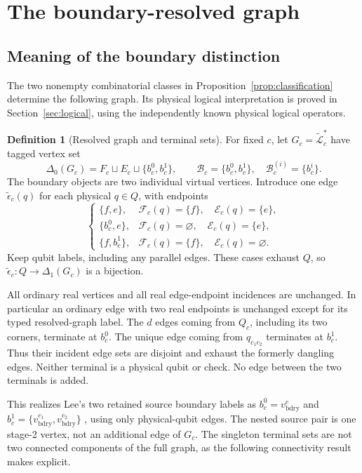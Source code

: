 \documentclass[11pt]{article}
\theoremstyle{definition}
\newtheorem{definition}{Definition}[section]
\theoremstyle{plain}
\theoremstyle{remark}
\newcommand{\LL}{\mathcal L}
\newcommand{\eps}{\epsilon}
\begin{document}
\section{The boundary-resolved graph}\label{sec:resolved}
\subsection{Meaning of the boundary distinction}
The two nonempty combinatorial classes in
Proposition~\ref{prop:classification} determine the following graph.
Its physical logical interpretation is proved in
Section~\ref{sec:logical}, using the independently known physical
logical operators.

\begin{definition}[Resolved graph and terminal sets]\label{def:resolved}
For fixed $c$, let $G_c=\widetilde{\LL}_c^*$ have tagged vertex set
\[
 \Delta_0(G_c)=F_c\sqcup E_c\sqcup\{b_c^0,b_c^1\},\qquad
 \mathcal B_c=\{b_c^0,b_c^1\},\quad
 \mathcal B_c^{(i)}=\{b_c^i\}.
\]
The boundary objects are two individual virtual vertices. Introduce one
edge $\widetilde\eps_c(q)$ for each physical $q\in Q$, with endpoints
\begin{equation}
 \begin{cases}
 \{f,e\},&
  \mathcal F_c(q)=\{f\},\quad\mathcal E_c(q)=\{e\},\\
 \{b_c^0,e\},&
  \mathcal F_c(q)=\varnothing,\quad\mathcal E_c(q)=\{e\},\\
 \{f,b_c^1\},&
  \mathcal F_c(q)=\{f\},\quad\mathcal E_c(q)=\varnothing .
 \end{cases}                                                   \label{eq:resolved}
\end{equation}
Keep qubit labels, including any parallel edges. These cases exhaust $Q$,
so $\widetilde\eps_c:Q\to\Delta_1(G_c)$ is a bijection.
\end{definition}

All ordinary real vertices and all real edge-endpoint incidences are
unchanged. In particular an ordinary edge with two real endpoints is
unchanged except for its typed resolved-graph label.
The $d$ edges coming from $Q_c$, including its two corners, terminate
at $b_c^0$. The unique edge coming from $q_{c_1c_2}$ terminates at
$b_c^1$. Thus their incident edge sets are disjoint and exhaust the
formerly dangling edges. Neither terminal is a physical qubit or check.
No edge between the two terminals is added.

This realizes Lee's two retained source boundary labels as
$b_c^0=v_{\mathrm{bdry}}^c$ and
$b_c^1=\{v_{\mathrm{bdry}}^{c_1},v_{\mathrm{bdry}}^{c_2}\}$
\cite[Appendix~A.3]{Lee}, using only physical-qubit edges.
The nested source pair is one stage-2 vertex, not an additional edge
of $G_c$. The singleton terminal sets are not two connected components
of the full graph, as the following connectivity result makes explicit.
\end{document}
